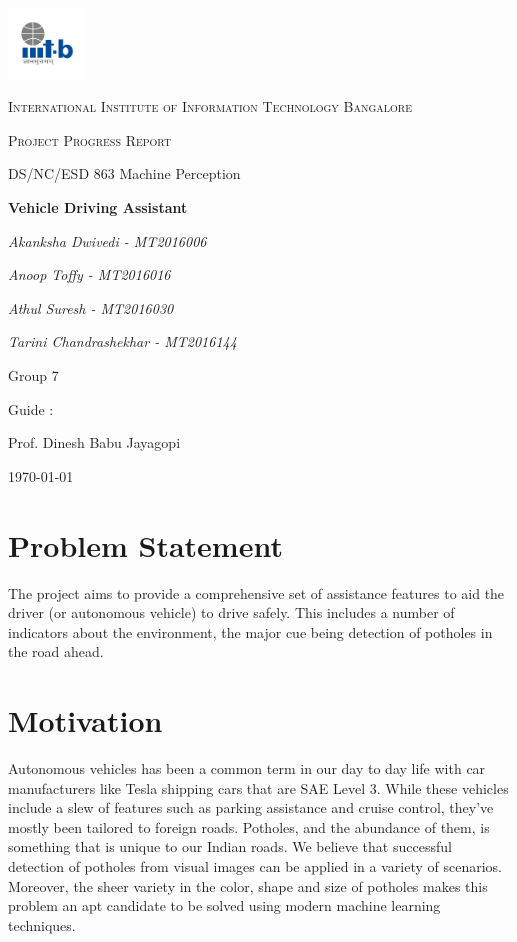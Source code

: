 \documentclass[12pt,a4paper]{article}
\begin{document}
\begin{titlepage}
	\centering
	\includegraphics[width=0.15\textwidth]{IIIT-B_logo.jpg}\par\vspace{1cm}
	{\scshape\LARGE International Institute of Information Technology Bangalore \par}
	\vspace{1cm}
	{\scshape\Large Project Progress Report\par}
	{\Large DS/NC/ESD 863 Machine Perception\par}
	\vspace{1.5cm}
	{\huge\bfseries Vehicle Driving Assistant \par}
	\vspace{2cm}	   
	{\Large\itshape Akanksha Dwivedi - MT2016006\par}
	{\Large\itshape Anoop Toffy - MT2016016\par}
	{\Large\itshape Athul Suresh - MT2016030\par}
	{\Large\itshape Tarini Chandrashekhar - MT2016144\par}
	\vfill
	{\huge Group 7 \par}
	\vfill
	Guide : \par
	Prof. Dinesh Babu Jayagopi 

	\vfill

	{\large \today\par}
\end{titlepage}


\tableofcontents
\listoffigures
\newpage

\section{Problem Statement}
The project aims to provide a comprehensive set of assistance features to aid the driver (or autonomous vehicle) to drive safely. This includes a number of indicators about the environment, the major cue being detection of potholes in the road ahead.


\section{Motivation}
Autonomous vehicles has been a common term in our day to day life with car manufacturers like Tesla shipping cars that are SAE Level 3. While these vehicles include a slew of features such as parking assistance and cruise control, they've mostly been tailored to foreign roads. Potholes, and the abundance of them, is something that is unique to our Indian roads. We believe that successful detection of potholes from visual images can be applied in a variety of scenarios.
Moreover, the sheer variety in the color, shape and size of potholes makes this problem an apt candidate to be solved using modern machine learning techniques. 
\end{document}
